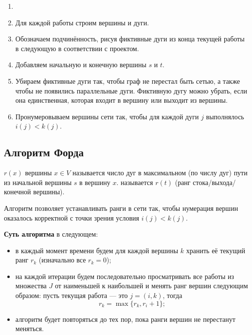
\begin{enumerate}[nosep]
	\item[]
	
	\item Для каждой работы строим вершины и дуги.
	
	\item Обозначаем подчинённость, рисуя фиктивные дуги из конца текущей работы в следующую в соответствии с проектом.
	
	\item Добавляем начальную и конечную вершины $s$ и $t$.
	
	\item Убираем фиктивные дуги так, чтобы граф не перестал быть сетью, а также чтобы не появились параллельные дуги. Фиктивную дугу можно убрать, если она единственная, которая входит в вершину или выходит из вершины.
	
	\item Пронумеровываем вершины сети так, чтобы для каждой дуги $j$ выполнялось $i(j) < k(j)$.
\end{enumerate}

\subsection{Алгоритм Форда}


 $r(x)$ вершины $x \in V$ называется число дуг в максимальном (по числу дуг) пути из начальной вершины $s$ в вершину $x$.  называется $r(t)$ (ранг стока/выхода/конечной вершины).

\algorithm[Форда]

Алгоритм позволяет устанавливать ранги в сети так, чтобы нумерация вершин оказалось корректной с точки зрения условия $i(j) < k(j)$.

\textbf{Суть алгоритма} в следующем:

\begin{itemize}[nosep]
	\item в каждый момент времени будем для каждой вершины $k$ хранить её текущий ранг $r_k$ (изначально все $r_k = 0$);
	
	\item на каждой итерации будем последовательно просматривать все работы из множества $J$ от наименьшей к наибольшей и менять ранг вершин следующим образом: пусть текущая работа --- это $j = (i, k)$, тогда
	\[
	r_k = \max\{r_k, r_i+1\};
	\]
	
	\item алгоритм будет повторяться до тех пор, пока ранги вершин не перестанут меняться.
\end{itemize}

